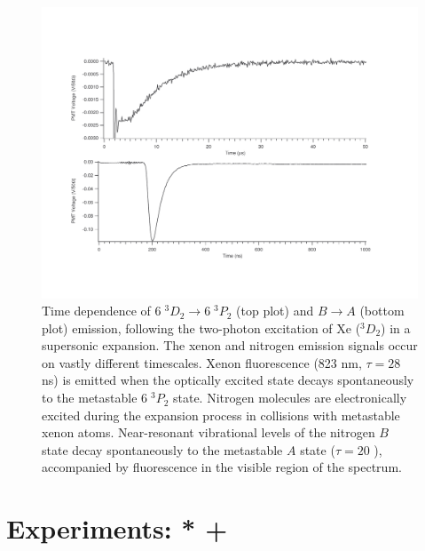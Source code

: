 \documentclass[12pt]{mitthesis}
\begin{document}
\begin{figure}
  \caption{Time dependence of  $6\;^3D_2 \rightarrow 6\;^3P_2$
    (top plot) and  $B \rightarrow A$ (bottom plot) emission,
    following the two-photon excitation of Xe ($^3D_2$) in a
    supersonic expansion.  The xenon and nitrogen emission signals
    occur on vastly different timescales.  Xenon fluorescence (823 nm,
    $\tau=28$ ns) is emitted when the optically excited state decays
    spontaneously to the metastable $6\;^3P_2$ state.  Nitrogen
    molecules are electronically excited during the expansion process
    in collisions with metastable xenon atoms.  Near-resonant
    vibrational levels of the nitrogen $B$ state decay spontaneously
    to the metastable $A$ state ($\tau=20$ \microsec), accompanied by
    fluorescence in the visible region of the spectrum.}
  \label{fig:xen2-traces}
  \centering
  \includegraphics[width=7.7in,angle=90,trim=0 0 1in 1cm ]{XeN2-traces.pdf}
\end{figure}



\section{Experiments: * + }

\end{document}
